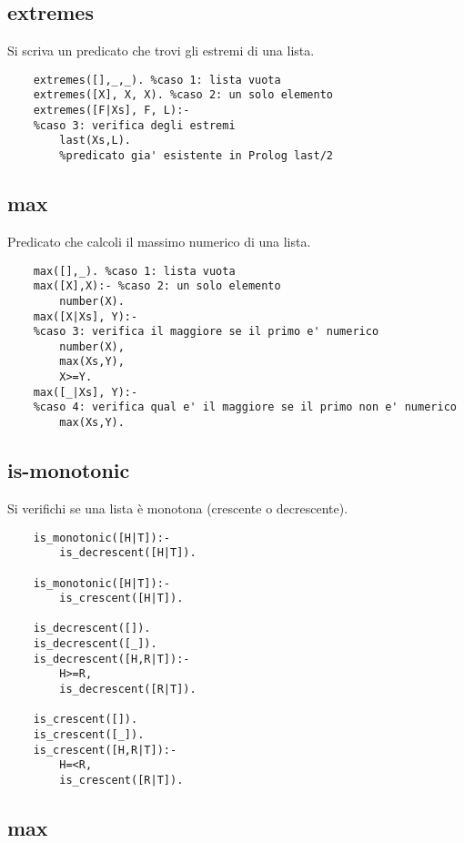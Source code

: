 \subsection{extremes}

Si scriva un predicato che trovi gli estremi di una lista.

\begin{lstlisting}
    extremes([],_,_). %caso 1: lista vuota
    extremes([X], X, X). %caso 2: un solo elemento
    extremes([F|Xs], F, L):- 
    %caso 3: verifica degli estremi
        last(Xs,L). 
        %predicato gia' esistente in Prolog last/2
\end{lstlisting}

\subsection{max}

Predicato che calcoli il massimo numerico di una lista.

\begin{lstlisting}
    max([],_). %caso 1: lista vuota
    max([X],X):- %caso 2: un solo elemento
        number(X).
    max([X|Xs], Y):- 
    %caso 3: verifica il maggiore se il primo e' numerico
        number(X), 
        max(Xs,Y),
        X>=Y.
    max([_|Xs], Y):- 
    %caso 4: verifica qual e' il maggiore se il primo non e' numerico
        max(Xs,Y).
\end{lstlisting}

\subsection{is-monotonic}

Si verifichi se una lista è monotona (crescente o decrescente).

\begin{lstlisting}
    is_monotonic([H|T]):-
        is_decrescent([H|T]).
    
    is_monotonic([H|T]):-
        is_crescent([H|T]).
    
    is_decrescent([]).
    is_decrescent([_]).
    is_decrescent([H,R|T]):-
        H>=R,
        is_decrescent([R|T]).
    
    is_crescent([]).
    is_crescent([_]).
    is_crescent([H,R|T]):-
        H=<R,
        is_crescent([R|T]).
\end{lstlisting}

\subsection{max}

